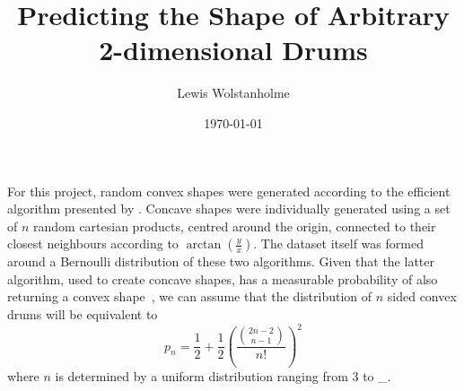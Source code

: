\title{Predicting the Shape of Arbitrary 2-dimensional Drums}
\author{Lewis Wolstanholme}
\date{\getDate\today}
\maketitle

\noindent For this project, random convex shapes were generated according to the efficient algorithm presented by \citet{valtrProbabilityThatRandom1995}.
Concave shapes were individually generated using a set of \(n\) random cartesian products, centred around the origin, connected to their closest neighbours according to \(\displaystyle \arctan \left( \frac{y}{x} \right)\).
The dataset itself was formed around a Bernoulli distribution of these two algorithms.
Given that the latter algorithm, used to create concave shapes, has a measurable probability of also returning a convex shape~\citep{valtrProbabilityThatRandom1995}, we can assume that the distribution of \(n\) sided convex drums will be equivalent to
\[ p_n = \frac{1}{2} + \frac{1}{2}\left( \frac{\genfrac(){0pt}{1}{2n - 2}{n-1}}{n!}\right)^2\]
where \(n\) is determined by a uniform distribution ranging from 3 to \_.